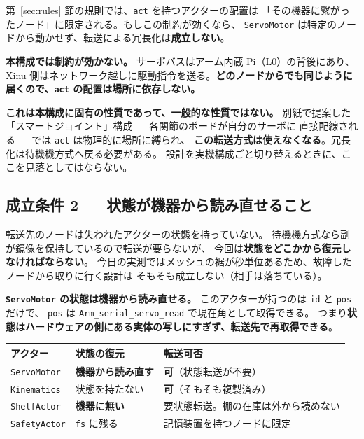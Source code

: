 \documentclass[11pt,a4paper]{article}
\newcommand{\code}[1]{\texttt{#1}}
\newcommand{\prob}[1]{\textbf{\textcolor{red!55!black}{#1}}}
\newcommand{\good}[1]{\textbf{\textcolor{green!45!black}{#1}}}
\begin{document}
第~\ref{sec:rules} 節の規則では、\code{act} を持つアクターの配置は
「その機器に繋がったノード」に限定される。もしこの制約が効くなら、
\code{ServoMotor} は特定のノードから動かせず、転送による冗長化は\textbf{成立しない}。

\good{本構成では制約が効かない。} サーボバスはアーム内蔵 Pi（L0）の背後にあり、
Xinu 側はネットワーク越しに駆動指令を送る。\textbf{どのノードからでも同じように
届くので、\code{act} の配置は場所に依存しない。}

\prob{これは本構成に固有の性質であって、一般的な性質ではない。}
別紙で提案した「スマートジョイント」構成 --- 各関節のボードが自分のサーボに
直接配線される --- では \code{act} は物理的に場所に縛られ、
\textbf{この転送方式は使えなくなる}。冗長化は待機機方式へ戻る必要がある。
設計を実機構成ごと切り替えるときに、ここを見落としてはならない。

\subsection{成立条件 2 --- 状態が機器から読み直せること}

転送先のノードは失われたアクターの状態を持っていない。
待機機方式なら副が鏡像を保持しているので転送が要らないが、
今回は\textbf{状態をどこかから復元しなければならない}。
今日の実測ではメッシュの裾が秒単位あるため、故障したノードから取りに行く設計は
そもそも成立しない（相手は落ちている）。

\good{\code{ServoMotor} の状態は機器から読み直せる。}
このアクターが持つのは \code{id} と \code{pos} だけで、
\code{pos} は \code{Arm\_serial\_servo\_read} で現在角として取得できる。
つまり\textbf{状態はハードウェアの側にある実体の写しにすぎず、転送先で再取得できる}。

\begin{center}\small
\begin{tabularx}{\textwidth}{@{}l l X@{}}
\toprule
\textbf{アクター} & \textbf{状態の復元} & \textbf{転送可否}\\
\midrule
\code{ServoMotor} & \good{機器から読み直す} & \good{可}（状態転送が不要）\\
\code{Kinematics} & 状態を持たない & \good{可}（そもそも複製済み）\\
\code{ShelfActor} & \prob{機器に無い} & 要状態転送。棚の在庫は外から読めない\\
\code{SafetyActor} & \code{fs} に残る & 記憶装置を持つノードに限定\\
\bottomrule
\end{tabularx}
\end{center}
\end{document}
